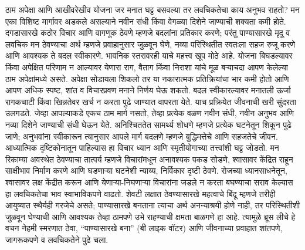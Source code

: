 ठाम अपेक्षा आणि आखीवरेखीव योजना जर मनात घट्ट बसवल्या तर लवचिकतेचा काय अनुभव राहतो? मन एका विशिष्ट मार्गावर अडकले असल्याने नवीन संधी किंवा वेगळ्या दिशेने जाण्याची शक्यता कमी होते. दगडासारखे कठोर विचार आणि वागणूक ठेवणे म्हणजे बदलांना प्रतिकार करणे; परंतु पाण्यासारखे मृदू व लवचिक मन ठेवण्याचा अर्थ म्हणजे प्रवाहानुसार जुळवून घेणे, नव्या परिस्थितीत स्वतःला सहज रुजू करणे आणि आवश्यक ते बदल स्वीकारणे.
भावनिक स्तरावरही याचे महत्त्व खूप मोठे आहे. योजना बिघडल्यावर किंवा अपेक्षित परिणाम न आल्यावर येणारा राग, वैताग किंवा निराशा यांचे मूळ बऱ्याचदा आपण केलेल्या ठाम अपेक्षांमध्ये असते. अपेक्षा सोडायला शिकलो तर या नकारात्मक प्रतिक्रियांचा भार कमी होतो आणि आपण अधिक स्पष्ट, शांत व विचारप्रवण मनाने निर्णय घेऊ शकतो. बदल स्वीकारल्यावर मनातली ऊर्जा रागकचाटी किंवा खिन्नतेवर खर्च न करता पुढे जाण्यात वापरता येते.
याच प्रक्रियेत जीवनाची खरी सुंदरता उलगडते. जेव्हा आपल्याकडे एकच ठाम मार्ग नसतो, तेव्हा प्रत्येक वळण नवीन संधी, नवीन अनुभव आणि नव्या दिशेने जाण्याची संधी घेऊन येते. अनिश्चिततेत सामर्थ्य शोधणे म्हणजे प्रत्येक घटनेतून शिकून पुढे जाणे; अनुभवांना स्वीकारून त्यानुसार आपले मार्ग बदलणे म्हणजे बुद्धिमत्तेचे आणि सहजतेचे जीवन.
आध्यात्मिक दृष्टिकोनातून पाहिल्यास हा विचार ध्यान आणि स्मृतीयोगाच्या तत्त्वांशी घट्ट जोडतो. मन रिकाम्या अवस्थेत ठेवण्याचा तात्पर्य म्हणजे विचारांमधून अनावश्यक पकड सोडणे, श्वासावर केंद्रित राहून साक्षीभाव निर्माण करणे आणि घडणाऱ्या घटनेशी न्याय्य, निर्विकार दृष्टी ठेवणे. रोजच्या ध्यानसाधनेतून, श्वासावर लक्ष केंद्रीत करून आणि येणाऱ्या-निघणाऱ्या विचारांना जडले न करता बघण्याचा सराव केल्यास हा लवचिकतेचा भाव स्वाभाविकपणे वाढतो.
शेवटी लक्षात ठेवण्यासारखे महत्वाचे बिंदू म्हणजे तरीही आयुष्यात स्थैर्यही गरजेचे असते; पाण्यासारखे बनताना त्याचा अर्थ अनन्याश्रयी होणे नाही, तर परिस्थितीशी जुळवून घेण्याची आणि आवश्यक तेव्हा ठामपणे उभे राहण्याची क्षमता बाळगणे हा आहे. त्यामुळे ब्रूस लीचे हे वचन नेहमी स्मरणात ठेवा, “पाण्यासारखे बना” (बी लाइक वॉटर) आणि जीवनाच्या प्रवाहात शांतपणे, जागरूकपणे व लवचिकतेने पुढे चला.

